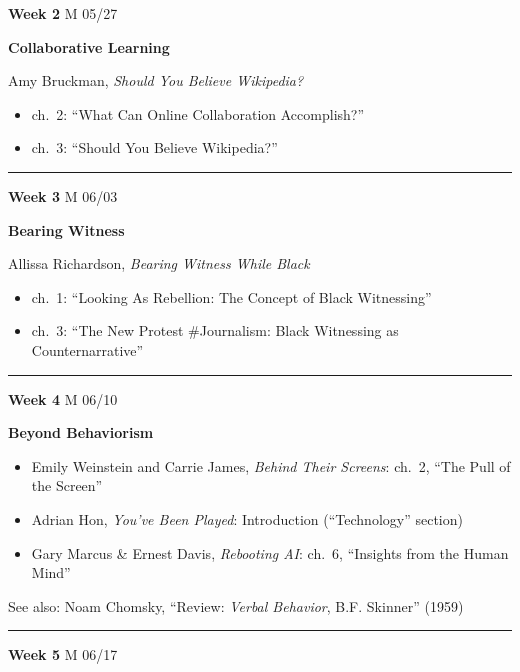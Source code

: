 \documentclass[
  letterpaper,
  DIV=11,
  numbers=noendperiod,
  oneside]{scrartcl}
\providecommand{\tightlist}{%
  \setlength{\itemsep}{0pt}\setlength{\parskip}{0pt}}\usepackage{longtable,booktabs,array}
\begin{document}
\textbf{Week 2} M 05/27

\textbf{Collaborative Learning}

Amy Bruckman, \emph{Should You Believe Wikipedia?}

\begin{itemize}
\tightlist
\item
  ch.~2: ``What Can Online Collaboration Accomplish?''
\item
  ch.~3: ``Should You Believe Wikipedia?''
\end{itemize}

\begin{center}\rule{0.5\linewidth}{0.5pt}\end{center}

\textbf{Week 3} M 06/03

\textbf{Bearing Witness}

Allissa Richardson, \emph{Bearing Witness While Black}

\begin{itemize}
\tightlist
\item
  ch.~1: ``Looking As Rebellion: The Concept of Black Witnessing''
\item
  ch.~3: ``The New Protest \#Journalism: Black Witnessing as
  Counternarrative''
\end{itemize}

\begin{center}\rule{0.5\linewidth}{0.5pt}\end{center}

\textbf{Week 4} M 06/10

\textbf{Beyond Behaviorism}

\begin{itemize}
\tightlist
\item
  Emily Weinstein and Carrie James, \emph{Behind Their Screens}: ch.~2,
  ``The Pull of the Screen''
\item
  Adrian Hon, \emph{You've Been Played}: Introduction (``Technology''
  section)
\item
  Gary Marcus \& Ernest Davis, \emph{Rebooting AI}: ch.~6, ``Insights
  from the Human Mind''
\end{itemize}

See also: Noam Chomsky, ``Review: \emph{Verbal Behavior}, B.F. Skinner''
(1959)

\begin{center}\rule{0.5\linewidth}{0.5pt}\end{center}

\textbf{Week 5} M 06/17
\end{document}
